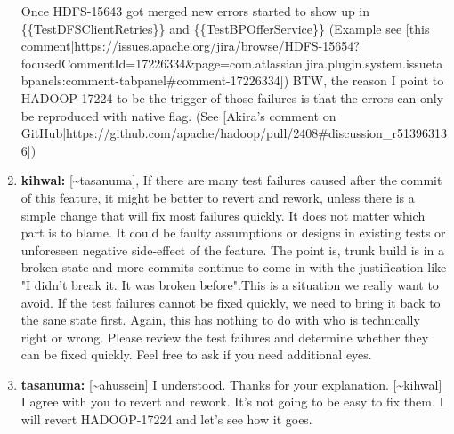 \documentclass{report}%
\begin{document}
\begin{enumerate}
\newline%
Once HDFS{-}15643 got merged new errors started to show up in \{\{TestDFSClientRetries\}\} and \{\{TestBPOfferService\}\} (Example see {[}this comment|https://issues.apache.org/jira/browse/HDFS{-}15654?focusedCommentId=17226334\&page=com.atlassian.jira.plugin.system.issuetabpanels:comment{-}tabpanel\#comment{-}17226334{]})\newline%
\newline%
\newline%
\newline%
BTW, the reason I point to HADOOP{-}17224 to be the trigger of those failures is that the errors can only be reproduced with native flag. (See {[}Akira's comment on GitHub|https://github.com/apache/hadoop/pull/2408\#discussion\_r513963136{]})%
\item%
\textbf{kihwal: }{[}\textasciitilde{}tasanuma{]}, If there are many test failures caused after the commit of this feature, it might be better to revert and rework, unless there is a simple change that will fix most failures quickly. It does not matter which part is to blame. It could be faulty assumptions or designs in existing tests or unforeseen negative side{-}effect of the feature. The point is, trunk build is in a broken state and more commits continue to come in with the justification like "I didn't break it. It was broken before".This is a situation we really want to avoid.\newline%
\newline%
\newline%
\newline%
If the test failures cannot be fixed quickly, we need to bring it back to the sane state first. Again, this has nothing to do with who is technically right or wrong.  Please review the test failures and determine whether they can be fixed quickly.  Feel free to ask if you need additional eyes.%
\item%
\textbf{tasanuma: }{[}\textasciitilde{}ahussein{]} I understood. Thanks for your explanation.\newline%
\newline%
\newline%
\newline%
{[}\textasciitilde{}kihwal{]} I agree with you to revert and rework. It's not going to be easy to fix them.\newline%
\newline%
\newline%
\newline%
I will revert HADOOP{-}17224 and let's see how it goes.%

\end{enumerate}
\end{document}
